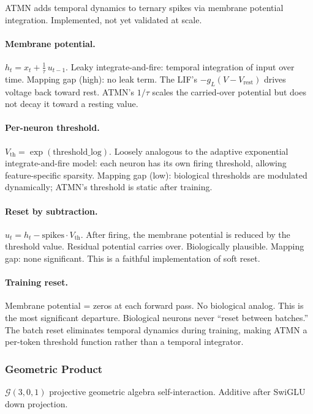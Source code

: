 \documentclass[11pt,a4paper]{article}
\begin{document}
ATMN adds temporal dynamics to ternary spikes via membrane potential integration. Implemented, not yet validated at scale.

\paragraph{Membrane potential.}
$h_t = x_t + \frac{1}{\tau}\, u_{t-1}$. Leaky integrate-and-fire: temporal integration of input over time. Mapping gap (high): no leak term. The LIF's $-g_L(V - V_{\mathrm{rest}})$ drives voltage back toward rest. ATMN's $1/\tau$ scales the carried-over potential but does not decay it toward a resting value.

\paragraph{Per-neuron threshold.}
$V_{\mathrm{th}} = \exp(\mathrm{threshold\_log})$. Loosely analogous to the adaptive exponential integrate-and-fire model: each neuron has its own firing threshold, allowing feature-specific sparsity. Mapping gap (low): biological thresholds are modulated dynamically; ATMN's threshold is static after training.

\paragraph{Reset by subtraction.}
$u_t = h_t - \mathrm{spikes} \cdot V_{\mathrm{th}}$. After firing, the membrane potential is reduced by the threshold value. Residual potential carries over. Biologically plausible. Mapping gap: none significant. This is a faithful implementation of soft reset.

\paragraph{Training reset.}
Membrane potential = zeros at each forward pass. No biological analog. This is the most significant departure. Biological neurons never ``reset between batches.'' The batch reset eliminates temporal dynamics during training, making ATMN a per-token threshold function rather than a temporal integrator.

\subsubsection{Geometric Product}

$\mathcal{G}(3,0,1)$ projective geometric algebra self-interaction. Additive after SwiGLU down projection.
\end{document}
